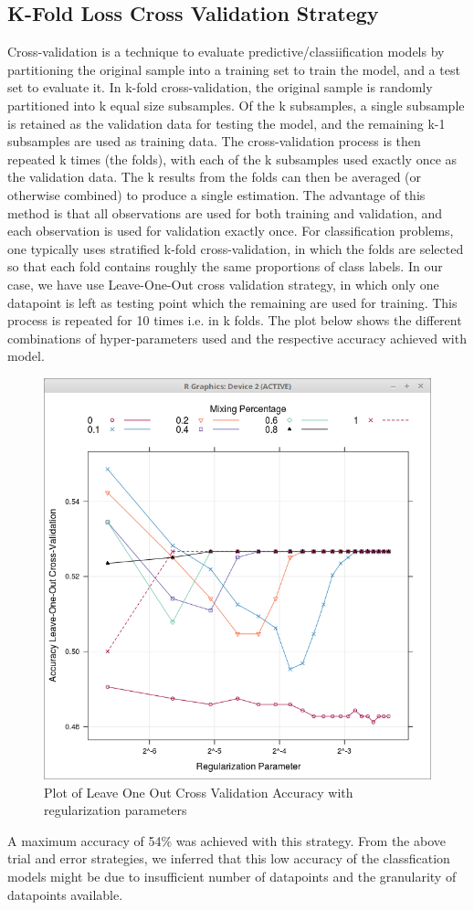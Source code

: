 \documentclass{article}
\begin{document}
\newpage
\subsection{K-Fold Loss Cross Validation Strategy}
Cross-validation is a technique to evaluate predictive/classiification models by partitioning the original sample into a training set to train the model, and a test set to evaluate it. In k-fold cross-validation, the original sample is randomly partitioned into k equal size subsamples. Of the k subsamples, a single subsample is retained as the validation data for testing the model, and the remaining k-1 subsamples are used as training data. The cross-validation process is then repeated k times (the folds), with each of the k subsamples used exactly once as the validation data. The k results from the folds can then be averaged (or otherwise combined) to produce a single estimation. The advantage of this method is that all observations are used for both training and validation, and each observation is used for validation exactly once. For classification problems, one typically uses stratified k-fold cross-validation, in which the folds are selected so that each fold contains roughly the same proportions of class labels.
In our case, we have use Leave-One-Out cross validation strategy, in which only one datapoint is left as testing point which the remaining are used for training. This process is repeated for 10 times i.e. in k folds. The plot below shows the different combinations of hyper-parameters used and the respective accuracy achieved with model.
\begin{figure}[ht]
	\centering
	\includegraphics[width = 6 cm]{loocv.png}
	\caption{Plot of Leave One Out Cross Validation Accuracy with regularization parameters}
	\label{fig: loocv}
\end{figure}
A maximum accuracy of 54\% was achieved with this strategy.
From the above trial and error strategies, we inferred that this low accuracy of the classfication models might be due to insufficient number of datapoints and the granularity of datapoints available.
\end{document}
